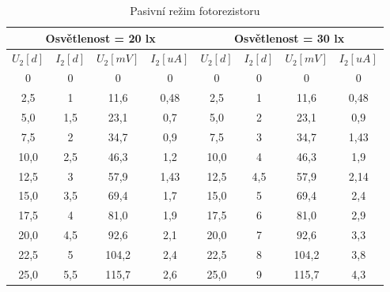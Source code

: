 \documentclass[12pt]{article} %
\begin{document}
\begin{table}[H]
\caption{Pasivní režim fotorezistoru}
\begin{tabular}{|c|c|c|c|c|c|c|c|}
\hline 
\multicolumn{4}{|c|}{Osvětlenost = 20 lx} & \multicolumn{4}{|c|}{Osvětlenost = 30 lx} \\ 
\hline 
$U_2 [d]$ & $I_2 [d]$ & $U_2 [mV]$ & $I_2 [uA]$ & $U_2 [d]$ & $I_2 [d]$ & $U_2 [mV]$ & $I_2 [uA]$ \\ 
\hline 
0 & 0 & 0 & 0 & 0 & 0 & 0 & 0 \\ 
\hline 
2,5 & 1 & 11,6 & 0,48 & 2,5 & 1 & 11,6 & 0,48 \\ 
\hline 
5,0 & 1,5 & 23,1 & 0,7 & 5,0 & 2 & 23,1 & 0,9 \\ 
\hline 
7,5 & 2 & 34,7 & 0,9 & 7,5 & 3 & 34,7 & 1,43 \\ 
\hline 
10,0 & 2,5 & 46,3 & 1,2 & 10,0 & 4 & 46,3 & 1,9 \\ 
\hline 
12,5 & 3 & 57,9 & 1,43 & 12,5 & 4,5 & 57,9 & 2,14 \\ 
\hline 
15,0 & 3,5 & 69,4 & 1,7 & 15,0 & 5 & 69,4 & 2,4 \\ 
\hline 
17,5 & 4 & 81,0 & 1,9 & 17,5 & 6 & 81,0 & 2,9 \\ 
\hline 
20,0 & 4,5 & 92,6 & 2,1 & 20,0 & 7 & 92,6 & 3,3 \\ 
\hline 
22,5 & 5 & 104,2 & 2,4 & 22,5 & 8 & 104,2 & 3,8 \\ 
\hline 
25,0 & 5,5 & 115,7 & 2,6 & 25,0 & 9 & 115,7 & 4,3 \\ 
\hline 
\end{tabular} 
\end{table}
\end{document}
